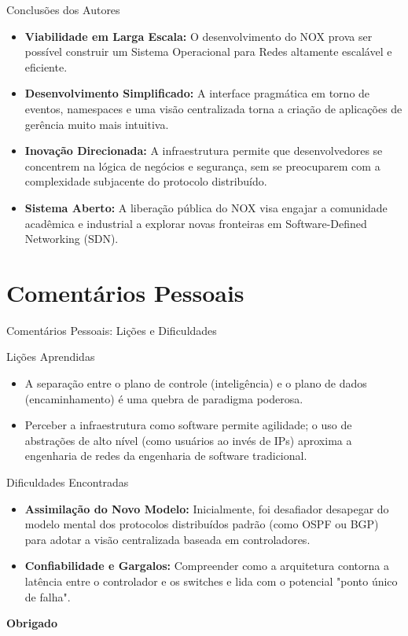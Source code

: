 \documentclass[aspectratio=169,xcolor=dvipsnames]{beamer}
\begin{document}
\begin{frame}{Conclusões dos Autores}
    \begin{itemize}
        \item \textbf{Viabilidade em Larga Escala:} O desenvolvimento do NOX prova ser possível construir um Sistema Operacional para Redes altamente escalável e eficiente.
        \item \textbf{Desenvolvimento Simplificado:} A interface pragmática em torno de eventos, namespaces e uma visão centralizada torna a criação de aplicações de gerência muito mais intuitiva.
        \item \textbf{Inovação Direcionada:} A infraestrutura permite que desenvolvedores se concentrem na lógica de negócios e segurança, sem se preocuparem com a complexidade subjacente do protocolo distribuído.
        \item \textbf{Sistema Aberto:} A liberação pública do NOX visa engajar a comunidade acadêmica e industrial a explorar novas fronteiras em Software-Defined Networking (SDN).
    \end{itemize}
\end{frame}

\section{Comentários Pessoais}

\begin{frame}{Comentários Pessoais: Lições e Dificuldades}
    \begin{block}{Lições Aprendidas}
        \small
        \begin{itemize}
            \item A separação entre o plano de controle (inteligência) e o plano de dados (encaminhamento) é uma quebra de paradigma poderosa.
            \item Perceber a infraestrutura como software permite agilidade; o uso de abstrações de alto nível (como usuários ao invés de IPs) aproxima a engenharia de redes da engenharia de software tradicional.
        \end{itemize}
    \end{block}
    
    \begin{block}{Dificuldades Encontradas}
        \small
        \begin{itemize}
            \item \textbf{Assimilação do Novo Modelo:} Inicialmente, foi desafiador desapegar do modelo mental dos protocolos distribuídos padrão (como OSPF ou BGP) para adotar a visão centralizada baseada em controladores.
            \item \textbf{Confiabilidade e Gargalos:} Compreender como a arquitetura contorna a latência entre o controlador e os switches e lida com o potencial "ponto único de falha".
        \end{itemize}
    \end{block}
\end{frame}


\begin{frame}
    \Huge{\centerline{\textbf{Obrigado}}}
\end{frame}
\end{document}
